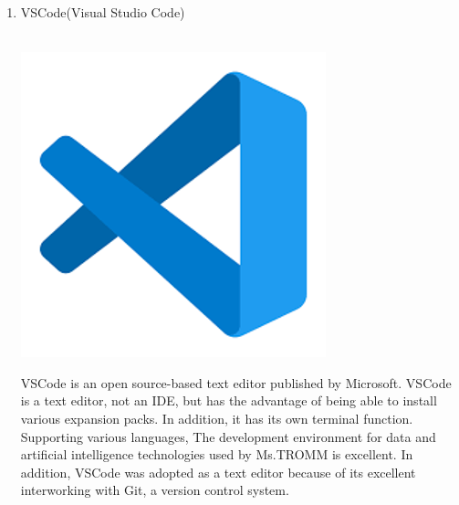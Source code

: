 \documentclass[conference]{IEEEtran}
\begin{document}
\begin{enumerate}
    \item VSCode(Visual Studio Code) \\ \\
    \centerline{\includegraphics[scale=0.9]{assets/vs.png}}
    VSCode is an open source-based text editor published by Microsoft. VSCode is a text editor, not an IDE, but has the advantage of being able to install various expansion packs. In addition, it has its own terminal function. Supporting various languages, The development environment for data and artificial intelligence technologies used by Ms.TROMM is excellent. In addition, VSCode was adopted as a text editor because of its excellent interworking with Git, a version control system.
    
    \break
    

\end{enumerate}
\end{document}
